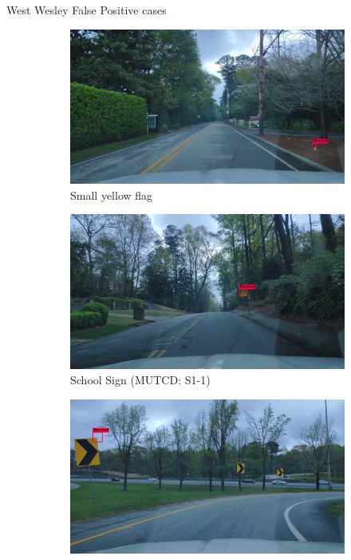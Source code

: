 \documentclass{beamer}
\begin{document}
\begin{frame}{West Wesley False Positive cases}
    \begin{figure}
      \begin{center}
        \begin{subfigure}[t]{.49\linewidth}
          \centering
          \includegraphics[width=0.99\linewidth]{figures/examples/westwestley/FP/FP02.jpg}
          \caption{Small yellow flag}
          \label{fig:wwFlag1FP}
        \end{subfigure}
        \begin{subfigure}[t]{.49\linewidth}
          \centering
          \includegraphics[width=0.99\linewidth]{figures/examples/westwestley/FP/FP05.jpg}
          \caption{School Sign (MUTCD: S1-1)}
          \label{fig:wwSchoolFP}
        \end{subfigure}
        \begin{subfigure}[t]{.49\linewidth}
          \centering
          \includegraphics[width=0.99\linewidth]{figures/examples/westwestley/FP/FP07.jpg}

\end{subfigure}
\end{center}
\end{figure}
\end{frame}
\end{document}
